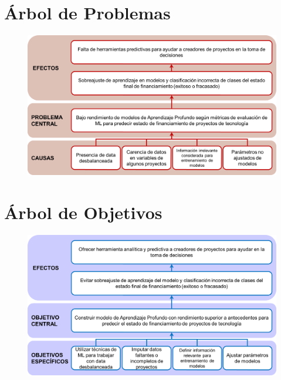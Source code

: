 \begin{appendices} 
\chapter{Árbol de Problemas}
\label{anexo1}
\begin{figure}[h]
	\begin{center}
		\includegraphics[width=1.05\textwidth]{anexos/arbol_problemas.png}
	\end{center}
\end{figure}

\chapter{Árbol de Objetivos}
\label{anexo2}
\begin{figure}[h]
	\begin{center}
		\includegraphics[width=1.05\textwidth]{anexos/arbol_objetivos.png}
	\end{center}
\end{figure}



\end{appendices}
